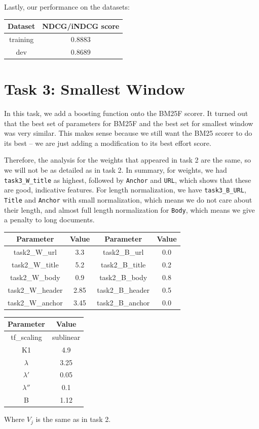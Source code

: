 \documentclass[10pt,twocolumn]{article}
\begin{document}
Lastly, our performance on the datasets:
\begin{table}[H]
\centering
\begin{tabular}{|c|c|}
\hline
Dataset & NDCG/iNDCG score \\\hline
training & 0.8883\\\hline
dev & 0.8689\\\hline
\end{tabular}
\end{table}
\section*{Task 3: Smallest Window}
In this task, we add a boosting function onto the BM25F scorer. It turned out that the best set of parameters for BM25F and the best set for smallest window was very similar. This makes sense because we still want the BM25 scorer to do its best -- we are just adding a modification to its best effort score. 

Therefore, the analysis for the weights that appeared in task 2 are the same, so we will not be as detailed as in task 2. In summary, for weights, we had \texttt{task3\_W\_title} as highest, followed by \texttt{Anchor} and \texttt{URL}, which shows that these are good, indicative features. For length normalization, we have \texttt{task3\_B\_URL}, \texttt{Title} and \texttt{Anchor} with small normalization, which means we do not care about their length, and almost full length normalization for \texttt{Body}, which means we give a penalty to long documents.
\begin{table}[H]
\centering
\begin{tabular}{|c|c|c|c|}
\hline
Parameter & Value & Parameter & Value\\\hline
task2\_W\_url & 3.3 & task2\_B\_url & 0.0\\\hline
task2\_W\_title & 5.2 & task2\_B\_title & 0.2\\\hline
task2\_W\_body & 0.9 & task2\_B\_body & 0.8\\\hline
task2\_W\_header & 2.85 & task2\_B\_header & 0.5 \\\hline
task2\_W\_anchor & 3.45 & task2\_B\_anchor & 0.0\\\hline
\end{tabular}
\end{table}
\begin{table}[H]
\centering
\begin{tabular}{|c|c|}
\hline
Parameter & Value\\\hline
tf\_scaling & sublinear\\\hline
K1 & 4.9\\\hline
$\lambda$ & 3.25\\\hline
$\lambda'$ & 0.05\\\hline
$\lambda''$ & 0.1\\\hline
B & 1.12\\\hline
\end{tabular}
\end{table}
Where $V_j$ is the same as in task 2.
\end{document}
